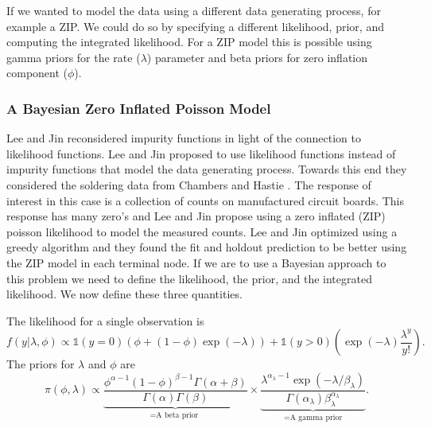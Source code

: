 \documentclass{article}
\begin{document}
If we wanted to model the data using a different data generating process, for example a ZIP. We could do so by specifying a different likelihood, prior, and computing the integrated likelihood. For a ZIP model this is possible using gamma priors for the rate ($\lambda$) parameter and beta priors for zero inflation component ($\phi$). 
 
 \subsubsection{A Bayesian Zero Inflated Poisson Model}
 
 Lee and Jin \cite{lee2006decision} reconsidered impurity functions in light of the connection to likelihood functions. Lee and Jin \cite{lee2006decision} proposed to use likelihood functions instead of impurity functions that model the data generating process. Towards this end they considered the soldering data from Chambers and Hastie \cite{chambers1991statistical}. The response of interest in this case is a collection of counts on manufactured circuit boards. This response has many zero's and Lee and Jin \cite{lee2006decision} propose using a zero inflated (ZIP) poisson likelihood to model the measured counts. Lee and Jin \cite{lee2006decision} optimized using a greedy algorithm and they found the fit and holdout prediction to be better using the ZIP model in each terminal node. If we are to use a Bayesian approach to this problem we need to define the likelihood, the prior, and the integrated likelihood. We now define these three quantities.
 
 The likelihood for a single observation is 
 \begin{equation}
 f(y\vert \lambda, \phi) \propto \mathds{1}(y=0)\left(\phi + (1-\phi)\exp{(-\lambda)}\right) + \mathds{1}(y>0)\left(\exp{(-\lambda)}\frac{\lambda^y}{y!}\right).
 \end{equation}
 The priors for $\lambda$ and $\phi$ are
 \begin{equation}
 \pi(\phi, \lambda)\propto \underbrace{\frac{\phi^{\alpha-1}(1-\phi)^{\beta-1}\Gamma(\alpha+\beta)}{\Gamma(\alpha)\Gamma(\beta)}}_{=\text{A beta prior }} \times \underbrace{\frac{ \lambda^{\alpha_{\lambda}-1}\exp{(-\lambda/\beta_{\lambda})} }{\Gamma(\alpha_{\lambda})\beta_{\lambda}^{\alpha_{\lambda}}}}_{=\text{A gamma prior}}.
 \end{equation}
\end{document}
